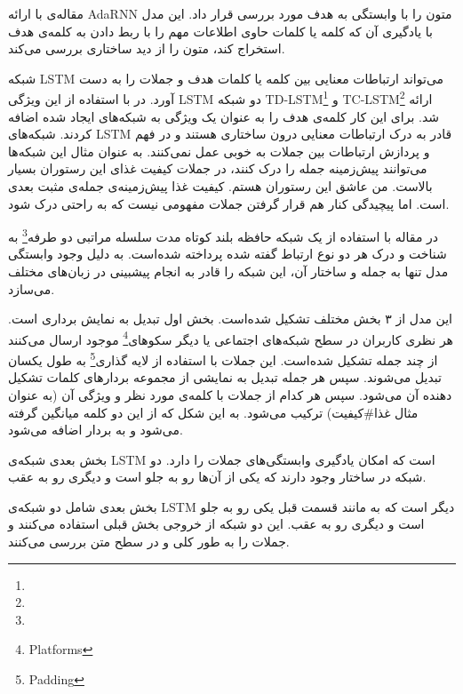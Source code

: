 \documentclass[12pt, a4paper, oneside]{report}
\begin{document}
مقاله‌ی
\cite{68dong-etal-2014-adaptive}
با ارائه
AdaRNN
متون را با وابستگی به هدف مورد بررسی قرار داد. این مدل با یادگیری آن که کلمه یا کلمات حاوی اطلاعات مهم را با
ربط دادن به کلمه‌ی هدف استخراج کند، متون را از دید ساختاری بررسی می‌کند.

شبکه
LSTM
می‌تواند ارتباطات معنایی بین کلمه‌ یا کلمات هدف و جملات را به دست آورد. در
\cite{70tang-etal-2016-effective}
با استفاده از این ویژگی
LSTM
دو شبکه
TD-LSTM\footnote{}
و
TC-LSTM\footnote{}
ارائه شد. برای این کار کلمه‌ی هدف را به عنوان یک ویژگی به شبکه‌های ایجاد شده اضافه کردند.
شبکه‌های
LSTM
قادر به درک ارتباطات معنایی درون ساختاری هستند و در فهم و پردازش ارتباطات بین جملات به خوبی عمل نمی‌کنند.
به عنوان مثال این شبکه‌ها می‌توانند پیش‌زمینه جمله را درک کنند، در جملات کیفیت غذای این رستوران بسیار بالاست.
من عاشق این رستوران هستم. کیفیت غذا پیش‌زمینه‌ی جمله‌ی مثبت بعدی است. اما پیچیدگی کنار هم
قرار گرفتن جملات مفهومی نیست که به راحتی درک شود.

در
\cite{71ruder-etal-2016-hierarchical}
مقاله با استفاده از یک شبکه حافظه بلند کوتاه مدت سلسله مراتبی دو طرفه\footnote{}
به شناخت و درک هر دو نوع ارتباط گفته شده پرداخته شده‌است. به دلیل وجود وابستگی مدل تنها به جمله و
ساختار آن، این شبکه را قادر به انجام پیشبینی در زبان‌های مختلف می‌سازد.

این مدل از ۳ بخش مختلف تشکیل شده‌است. بخش اول تبدیل به نمایش برداری است. هر نظری کاربران در سطح شبکه‌های
اجتماعی یا دیگر سکوهای\footnote{Platforms}
موجود ارسال می‌کنند از چند جمله تشکیل شده‌است. این جملات با استفاده از لایه گذاری\footnote{Padding}
به طول یکسان تبدیل می‌شوند. سپس هر جمله تبدیل به نمایشی از مجموعه بردارهای کلمات تشکیل دهنده آن می‌شود.
سپس هر کدام از جملات با کلمه‌ی مورد نظر و ویژگی آن (به عنوان مثال غذا\#کیفیت)
ترکیب می‌شود. به این شکل که از این دو کلمه میانگین گرفته می‌شود و به بردار اضافه می‌شود.

بخش بعدی شبکه‌ی
LSTM
است که امکان یادگیری وابستگی‌های جملات را دارد. دو شبکه‌ در ساختار وجود دارند که یکی از آن‌ها
رو به جلو است و دیگری رو به عقب.

بخش بعدی شامل دو شبکه‌ی
LSTM
دیگر است که به مانند قسمت قبل یکی رو به جلو است و دیگری رو به عقب. این دو شبکه از خروجی بخش قبلی
استفاده می‌کنند و جملات را به طور کلی و در سطح متن بررسی می‌کنند.
\end{document}
